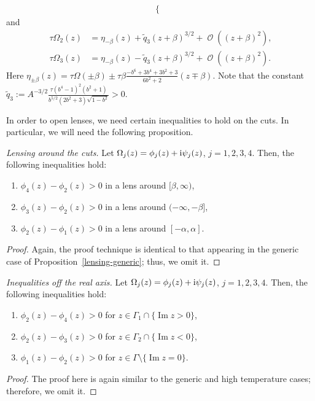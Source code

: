 \documentclass[pdftex]{sigma}
\DeclareMathOperator{\OO}{\mathcal{O}}
\numberwithin{equation}{section}
\begin{document}
\begin{prop}
\begin{enumerate}
\begin{align}
\begin{cases}
 \end{cases}
 \end{align}
 and
 \begin{align}
 \tau\Omega_2(z) &= \eta_{-\beta}(z) + \tilde{q}_3 (z +\beta)^{3/2} + \OO( (z+\beta)^2 ),\\
 \tau\Omega_3(z) &= \eta_{-\beta}(z) - \tilde{q}_3 (z +\beta)^{3/2} + \OO( (z+\beta)^2 ).
 \end{align}
 Here $\eta_{ \pm \beta}(z) = \tau \Omega(\pm \beta) \pm \tau \beta \frac{-b^6 + 3b^4 + 3b^2 + 3}{6b^2 + 2} (z\mp \beta)$.
 Note that the constant $\tilde{q}_3 := A^{-3/2}\frac{\tau (b^4-1)^2(b^2+1)}{b^{5/2}(2b^2 + 3)\sqrt{1-b^2}} >0$.
 \end{enumerate}
\end{prop}
In order to open lenses, we need certain inequalities to hold on the cuts. In particular, we will need the following proposition.
 \begin{prop}
 \textit{Lensing around the cuts.}
 Let $\Omega_j(z) = \phi_j(z) + {\rm i}\psi_j(z)$, $j= 1,2,3,4$. Then, the following inequalities hold:
 \begin{enumerate}\itemsep=0pt
 \item $\phi_4(z) - \phi_2(z) > 0$ in a lens around $[\beta,\infty)$,
 \item $\phi_3(z) - \phi_2(z) > 0$ in a lens around $(-\infty,-\beta]$,
 \item $\phi_2(z) - \phi_1(z) > 0$ in a lens around $[-\alpha,\alpha]$.
 \end{enumerate}
 \end{prop}
\begin{proof}
 Again, the proof technique is identical to that appearing in the generic case of Proposition~\ref{lensing-generic}; thus, we omit it.
\end{proof}

\begin{prop}
 \textit{Inequalities off the real axis.}
 Let $\Omega_j(z) = \phi_j(z) + {\rm i}\psi_j(z)$, $j = 1,2,3,4$. Then, the following inequalities hold:
 \begin{enumerate}\itemsep=0pt
 \item $\phi_2(z) - \phi_4(z) > 0$ for $z \in \Gamma_1 \cap \{\operatorname{Im} z > 0\}$,
 \item $\phi_2(z) - \phi_3(z) > 0$ for $z \in \Gamma_2 \cap \{\operatorname{Im} z < 0\}$,
 \item $\phi_1(z) - \phi_2(z) > 0$ for $z \in \Gamma \setminus \{\operatorname{Im} z = 0\}$.
 \end{enumerate}
\end{prop}
\begin{proof}
 The proof here is again similar to the generic and high temperature cases; therefore, we omit it.
\end{proof}
\end{document}
